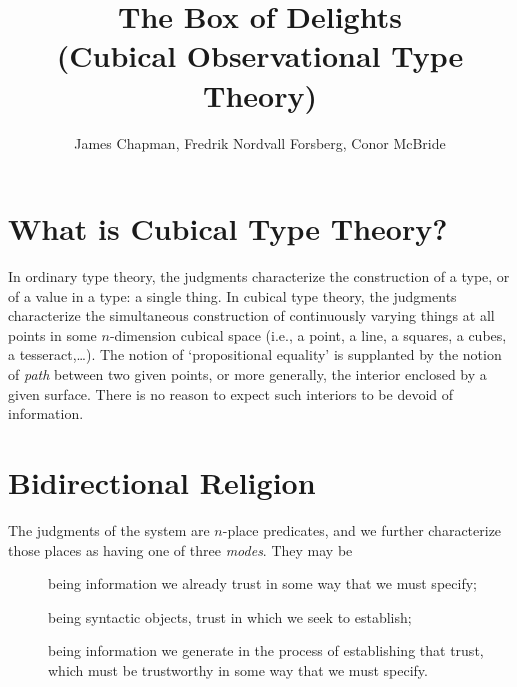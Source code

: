 \documentclass{article}
\begin{document}
\title{The Box of Delights\\
       (Cubical Observational Type Theory)}
\author{James Chapman, Fredrik Nordvall Forsberg, Conor McBride}
\maketitle

\newcommand{\V}[1]{\purple{\mathit{#1}}}
\newcommand{\JF}[1]{\framebox{\ensuremath{#1}}}
\newcommand{\sv}[1]{\purple{(\!\black{#1}\!)}}
\newcommand{\myv}{\overline}


\section{What is Cubical Type Theory?}

In ordinary type theory, the judgments characterize the construction of a type, or of a value in a type: a single thing. In cubical type theory, the judgments characterize the simultaneous construction of continuously varying things at all points in some $n$-dimension cubical space (i.e., a point, a line, a squares, a cubes, a tesseract,\ldots). The notion of `propositional equality' is supplanted by the notion of \emph{path} between two given points,
or more generally, the interior enclosed by a given surface. There is no reason to expect
such interiors to be devoid of information.


\section{Bidirectional Religion}

\newcommand{\INP}[1]{\pinkFG{#1}}
\newcommand{\SUB}[1]{\orange{#1}}
\newcommand{\OUP}[1]{\aquaFG{#1}}
\newcommand{\FIND}[1]{\dashv #1}

The judgments of the system are $n$-place predicates, and we further characterize those
places as having one of three \emph{modes}. They may be
\begin{description}
\item[\INP{inputs}] being information we already trust in some way that we must specify;
\item[\SUB{subjects}] being syntactic objects, trust in which we seek to establish;
\item[\OUP{outputs}] being information we generate in the process of establishing that trust, which must be trustworthy in some way that we must specify.
\end{description}
\end{document}
